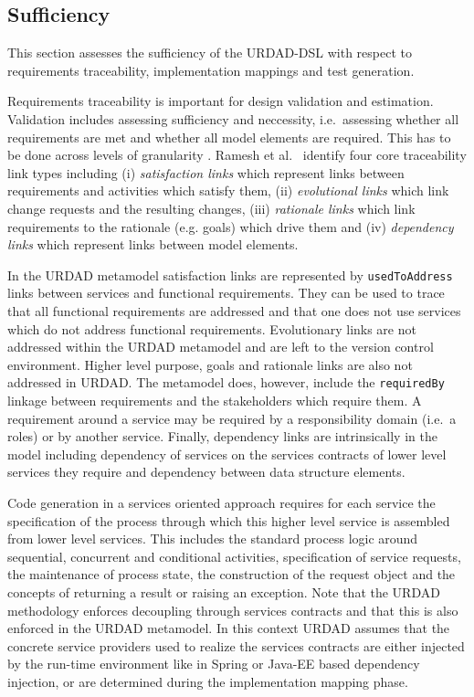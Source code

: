 \subsection{Sufficiency}

This section assesses the sufficiency of the URDAD-DSL with respect to requirements traceability, implementation mappings and test generation. 

Requirements traceability is important for design validation and estimation. Validation includes assessing sufficiency and neccessity, i.e.\ assessing whether all requirements are met and whether all model elements are required. This has to be done across levels of granularity \cite{dick_design_2005}. Ramesh et al.\ \cite{ramesh_toward_2001} identify four core traceability link types including (i) \emph{satisfaction links} which represent links between requirements and activities which satisfy them, (ii) \emph{evolutional links} which link change requests and the resulting changes, (iii) \emph{rationale links} which link requirements to the rationale (e.g. goals) which drive them and (iv) \emph{dependency links} which represent links between model elements.

In the URDAD metamodel satisfaction links are represented by \verb+usedToAddress+ links between services and functional requirements. They can be used to trace that all functional requirements are addressed and that one does not use services which do not address functional requirements. Evolutionary links are not addressed within the URDAD metamodel and are left to the version control environment. Higher level purpose, goals and rationale links are also not addressed in URDAD. The metamodel does, however, include the \verb+requiredBy+ linkage between requirements and the stakeholders which require them. A requirement around a service may be required by a responsibility domain (i.e.\ a roles) or by another service. Finally, dependency links are intrinsically in the model including  dependency of services on the services contracts of lower level services they require and dependency between data structure elements. 


Code generation in a services oriented approach requires for each service the specification of the process through which this higher level service is assembled from lower level services. This includes the standard process logic around sequential, concurrent and conditional activities, specification of service requests, the maintenance of process state, the construction of the request object and the concepts of returning a result or raising an exception. Note that the URDAD methodology enforces decoupling through services contracts and that this is also enforced in the URDAD metamodel. In this context URDAD assumes that the concrete service providers used to realize the services contracts are either injected by the run-time environment like in Spring or Java-EE based dependency injection, or are determined during the implementation mapping phase.


